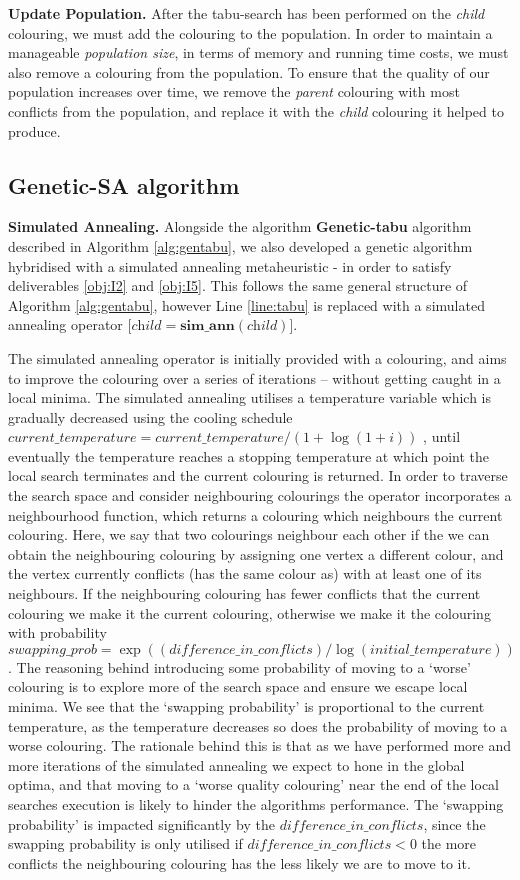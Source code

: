 \documentclass[12pt,a4paper]{article}
\begin{document}
\textbf{Update Population.} After the tabu-search has been performed on the \textit{child} colouring, we must add the colouring to the population. In order to maintain a manageable \textit{population size}, in terms of memory and running time costs, we must also remove a colouring from the population. To ensure that the quality of our population increases over time, we remove the \textit{parent} colouring with most conflicts from the population, and replace it with the \textit{child} colouring it helped to produce.

\subsection*{Genetic-SA algorithm}
\textbf{Simulated Annealing.} Alongside the algorithm \textbf{Genetic-tabu} algorithm described in Algorithm \ref{alg:gentabu}, we also developed a genetic algorithm hybridised with a simulated annealing metaheuristic - in order to satisfy deliverables \ref{obj:I2} and \ref{obj:I5}. This follows the same general structure of Algorithm \ref{alg:gentabu}, however Line \ref{line:tabu} is replaced with a simulated annealing operator [$\textit{child} = \textbf{sim\_ann}(\textit{child})$]. 
\par The simulated annealing operator is initially provided with a colouring, and aims to improve the colouring over a series of iterations – without getting caught in a local minima. The simulated annealing utilises a temperature variable which is gradually decreased using the cooling schedule $current\_temperature = current\_temperature/(1 + \log(1 + i))$ \cite{Geman}, until eventually the temperature reaches a stopping temperature at which point the local search terminates and the current colouring is returned. In order to traverse the search space and consider neighbouring colourings the operator incorporates a neighbourhood function, which returns a colouring which neighbours the current colouring. Here, we say that two colourings neighbour each other if the we can obtain the neighbouring colouring by assigning one vertex a different colour, and the vertex currently conflicts (has the same colour as) with at least one of its neighbours. If the neighbouring colouring has fewer conflicts that the current colouring we make it the current colouring, otherwise we make it the colouring with probability $swapping\_prob = \exp((difference\_in\_conflicts)/\log(initial\_temperature))$. The reasoning behind introducing some probability of moving to a `worse’ colouring is to explore more of the search space and ensure we escape local minima. We see that the `swapping probability’ is proportional to the current temperature, as the temperature decreases so does the probability of moving to a worse colouring. The rationale behind this is that as we have performed more and more iterations of the simulated annealing we expect to hone in the global optima, and that moving to a ‘worse quality colouring’ near the end of the local searches execution is likely to hinder the algorithms performance. The ‘swapping probability’ is impacted significantly by the $difference\_in\_conflicts$, since the swapping probability is only utilised if $difference\_in\_conflicts < 0$ the more conflicts the neighbouring colouring has the less likely we are to move to it.
\end{document}
